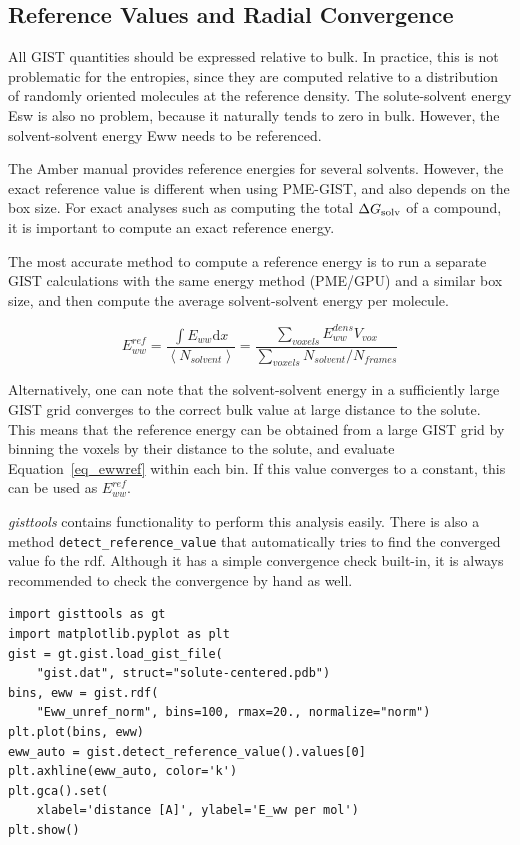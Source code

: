 \documentclass[9pt,tutorial]{livecoms}
\newcommand{\dgsolv}{\Delta G_\textup{solv}}
\newcommand{\software}{\emph}
\newcommand\inlinecode{\texttt}
\begin{document}
\subsection{Reference Values and Radial Convergence}
All GIST quantities should be expressed relative to bulk. In practice, this is not problematic for the entropies, since they are computed relative to a distribution of randomly oriented molecules at the reference density.
The solute-solvent energy Esw is also no problem, because it naturally tends to zero in bulk. 
However, the solvent-solvent energy Eww needs to be referenced.

The Amber manual provides reference energies for several solvents.
However, the exact reference value is different when using PME-GIST, and also depends on the box size.
For exact analyses such as computing the total $\dgsolv$ of a compound, it is important to compute an exact reference energy.

The most accurate method to compute a reference energy is to run a separate GIST calculations with the same energy method (PME/GPU) and a similar box size, and then compute the average solvent-solvent energy per molecule.

\begin{equation}
\label{eq_ewwref}
E_{ww}^\textit{ref} = \frac{\int{E_{ww}} \mathrm{d}x}{\left<N_\textit{solvent}\right>}
  = \frac{\sum_\textit{voxels}E_{ww}^\textit{dens} V_\textit{vox}}{\sum_\textit{voxels}{N_\textit{solvent}} / N_\textit{frames}}
\end{equation}

Alternatively, one can note that the solvent-solvent energy in a sufficiently large GIST grid converges to the correct bulk value at large distance to the solute.
This means that the reference energy can be obtained from a large GIST grid by binning the voxels by their distance to the solute, and evaluate Equation~\ref{eq_ewwref} within each bin.
If this value converges to a constant, this can be used as $E_{ww}^\textit{ref}$.

\software{gisttools} contains functionality to perform this analysis easily.
There is also a method \inlinecode{detect\_reference\_value} that automatically tries to find the converged value fo the rdf.
Although it has a simple convergence check built-in, it is always recommended to check the convergence by hand as well.

\begin{lstlisting}[style=python]
import gisttools as gt
import matplotlib.pyplot as plt
gist = gt.gist.load_gist_file(
    "gist.dat", struct="solute-centered.pdb")
bins, eww = gist.rdf(
    "Eww_unref_norm", bins=100, rmax=20., normalize="norm")
plt.plot(bins, eww)
eww_auto = gist.detect_reference_value().values[0]
plt.axhline(eww_auto, color='k')
plt.gca().set(
    xlabel='distance [A]', ylabel='E_ww per mol')
plt.show()
\end{lstlisting}
\end{document}
